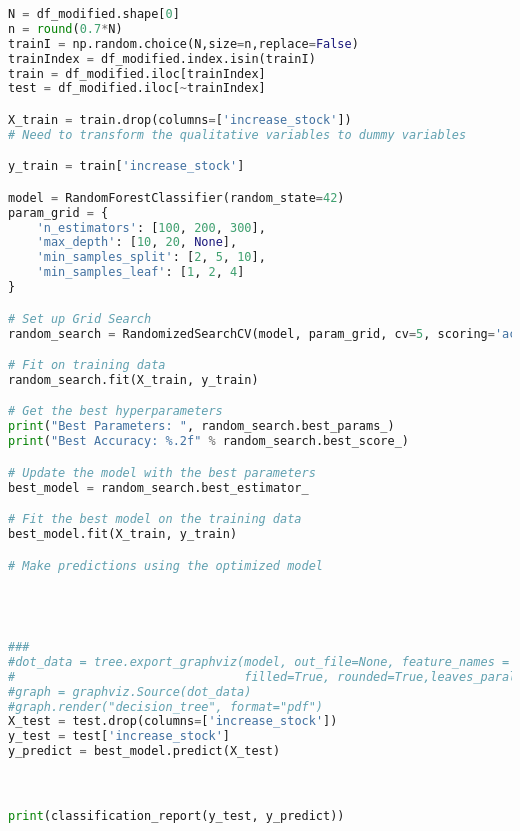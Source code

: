 \begin{lstlisting}[language = Python]
N = df_modified.shape[0]
n = round(0.7*N)
trainI = np.random.choice(N,size=n,replace=False)
trainIndex = df_modified.index.isin(trainI)
train = df_modified.iloc[trainIndex]
test = df_modified.iloc[~trainIndex]

X_train = train.drop(columns=['increase_stock'])
# Need to transform the qualitative variables to dummy variables 

y_train = train['increase_stock']

model = RandomForestClassifier(random_state=42)
param_grid = {
    'n_estimators': [100, 200, 300], 
    'max_depth': [10, 20, None],     
    'min_samples_split': [2, 5, 10], 
    'min_samples_leaf': [1, 2, 4]     
}

# Set up Grid Search
random_search = RandomizedSearchCV(model, param_grid, cv=5, scoring='accuracy', n_jobs=-1, verbose=2)

# Fit on training data
random_search.fit(X_train, y_train)

# Get the best hyperparameters
print("Best Parameters: ", random_search.best_params_)
print("Best Accuracy: %.2f" % random_search.best_score_)

# Update the model with the best parameters
best_model = random_search.best_estimator_

# Fit the best model on the training data
best_model.fit(X_train, y_train)

# Make predictions using the optimized model




###
#dot_data = tree.export_graphviz(model, out_file=None, feature_names = X_train.columns,class_names = model.classes_, 
#                                filled=True, rounded=True,leaves_parallel=True, proportion=True)
#graph = graphviz.Source(dot_data)
#graph.render("decision_tree", format="pdf")
X_test = test.drop(columns=['increase_stock'])
y_test = test['increase_stock']
y_predict = best_model.predict(X_test)



print(classification_report(y_test, y_predict))
\end{lstlisting}



